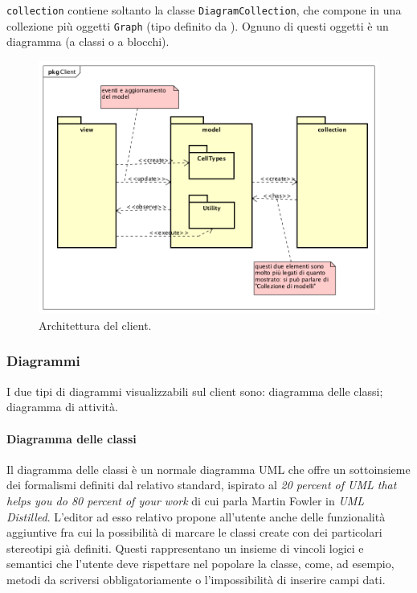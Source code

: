 \texttt{collection} contiene soltanto la classe \texttt{DiagramCollection}, che compone in una collezione più oggetti \texttt{Graph} (tipo definito da \jointjs). Ognuno di questi oggetti è un diagramma (a classi o a blocchi).

\begin{figure} \label{fig:client_pkg}
	\includegraphics[scale=0.5]{img/client_pkg}
	\caption{Architettura del client.}
\end{figure}

\subsubsection{Diagrammi}
I due tipi di diagrammi visualizzabili sul client sono: diagramma delle classi; diagramma di attività.

	\paragraph{Diagramma delle classi}
Il diagramma delle classi è un normale diagramma UML che offre un sottoinsieme dei formalismi definiti dal relativo standard, ispirato al \emph{20 percent of UML that helps you do 80 percent of your work} di cui parla Martin Fowler in \emph{UML Distilled}. L'editor ad esso relativo propone all'utente anche delle funzionalità aggiuntive fra cui la possibilità di marcare le classi create con dei particolari stereotipi già definiti. Questi rappresentano un insieme di vincoli logici e semantici che l'utente deve rispettare nel popolare la classe, come, ad esempio, metodi da scriversi obbligatoriamente o l'impossibilità di inserire campi dati.
